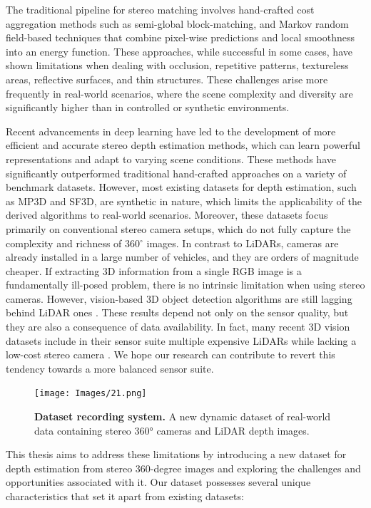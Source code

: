 \documentclass[english, LaM, oneside]{sapthesis}%
\begin{document}
The traditional pipeline for stereo matching involves hand-crafted cost aggregation methods such as semi-global block-matching, and Markov random field-based techniques that combine pixel-wise predictions and local smoothness into an energy function. These approaches, while successful in some cases, have shown limitations when dealing with occlusion, repetitive patterns, textureless areas, reflective surfaces, and thin structures. These challenges arise more frequently in real-world scenarios, where the scene complexity and diversity are significantly higher than in controlled or synthetic environments.

Recent advancements in deep learning have led to the development of more efficient and accurate stereo depth estimation methods, which can learn powerful representations and adapt to varying scene conditions. These methods have significantly outperformed traditional hand-crafted approaches on a variety of benchmark datasets. However, most existing datasets for depth estimation, such as MP3D\cite{ref:d3} and SF3D\cite{ref:SF3D}, are synthetic in nature, which limits the applicability of the derived algorithms to real-world scenarios. Moreover, these datasets focus primarily on conventional stereo camera setups, which do not fully capture the complexity and richness of 360$^\circ$ images.  In contrast to LiDARs, cameras are already installed in a large number of vehicles, and they are orders of magnitude cheaper. If extracting 3D information from a single RGB image is a fundamentally ill-posed problem, there is no intrinsic limitation when using stereo cameras. However, vision-based 3D object detection algorithms are still lagging behind LiDAR ones \cite{int19,int20}. These results depend not only on the sensor quality, but they are also a consequence of data availability. In fact, many recent 3D vision datasets include in their sensor suite multiple expensive LiDARs while lacking a low-cost stereo camera \cite{int21 ,int22, int23}. We hope our research can contribute to revert this tendency towards a more balanced sensor suite.

\begin{figure}[h]
    \centering
    \texttt{[image: Images/21.png]}
    \caption{\textbf{Dataset recording system.} A new dynamic dataset of real-world data containing stereo 360° cameras and LiDAR depth images.}
    \label{fig:21 depth}
\end{figure}

This thesis aims to address these limitations by introducing a new dataset for depth estimation from stereo 360-degree images and exploring the challenges and opportunities associated with it. Our dataset possesses several unique characteristics that set it apart from existing datasets:
\end{document}

